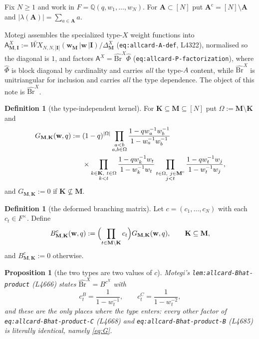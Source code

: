 \documentclass[11pt]{article}
\theoremstyle{plain}
\newtheorem{prop}[thm]{Proposition}
\theoremstyle{definition}
\newtheorem{defn}[thm]{Definition}
\theoremstyle{remark}
\newcommand{\bM}{\mathbf M}
\newcommand{\bK}{\mathbf K}
\newcommand{\bI}{\mathbf I}
\newcommand{\bA}{\mathbf A}
\newcommand{\bw}{\mathbf w}
\newcommand{\cm}{{\mathrm c}}
\newcommand{\Bh}{\widehat{\mathrm{Br}}}
\begin{document}
Fix $N\ge1$ and work in $F=\mathbb Q(q,w_1,\dots,w_N)$. For $\bA\subset[N]$ put
$\bA^\cm=[N]\setminus\bA$ and $|\lambda(\bA)|=\sum_{a\in\bA}a$.

Motegi assembles the specialized type-$X$ weight functions into
$\mathsf A^X_{\bM,\bI}:=\widetilde{WX}_{N,N,|\bI|}(\bw_\bM\,|\bw\,|\bI)/\Delta^X_\bM$
(\texttt{eq:allcard-A-def}, L4322), normalised so the diagonal is $1$, and factors
$\mathsf A^X=\Bh^X\widehat\Phi$ (\texttt{eq:allcard-P-factorization}), where
$\widehat\Phi$ is block diagonal by cardinality and carries \emph{all} the type-$A$
content, while $\Bh^X$ is unitriangular for inclusion and carries \emph{all} the
type dependence. The object of this note is $\Bh^X$.

\begin{defn}[the type-independent kernel]
\label{def:G}
For $\bK\subseteq\bM\subseteq[N]$ put $\Omega:=\bM\setminus\bK$ and
\begin{align}
G_{\bM,\bK}(\bw,q):={}&(1-q)^{|\Omega|}
\prod_{\substack{a<b\\ a,b\in\Omega}}
\frac{1-qw_a^{-1}w_b^{-1}}{1-w_a^{-1}w_b^{-1}}
\notag\\
&\times
\prod_{\substack{k\in\bK,\ t\in\Omega\\ k<t}}
\frac{1-qw_k^{-1}w_t}{1-w_k^{-1}w_t}
\prod_{\substack{t\in\Omega,\ j\in\bM^\cm\\ j<t}}
\frac{1-qw_t^{-1}w_j}{1-w_t^{-1}w_j},
\label{eq:G}
\end{align}
and $G_{\bM,\bK}:=0$ if $\bK\not\subseteq\bM$.
\end{defn}

\begin{defn}[the deformed branching matrix]
\label{def:Bc}
Let $c=(c_1,\dots,c_N)$ with each $c_t\in F^\times$. Define
\[
B^c_{\bM,\bK}(\bw,q):=\Bigl(\prod_{t\in\bM\setminus\bK}c_t\Bigr)G_{\bM,\bK}(\bw,q),
\qquad \bK\subseteq\bM,
\]
and $B^c_{\bM,\bK}:=0$ otherwise.
\end{defn}

\begin{prop}[the two types are two values of $c$]
\label{prop:types}
Motegi's \texttt{lem:allcard-Bhat-product} {\rm(L4666)} states
$\Bh^X=B^{c^X}$ with
\[
c^B_t=\frac1{1-w_t^{-1}},\qquad c^C_t=\frac1{1-w_t^{-2}},
\]
and these are the \emph{only} places where the type enters: every other factor of
\texttt{eq:allcard-Bhat-product-C} (L4668) and \texttt{eq:allcard-Bhat-product-B}
(L4685) is literally identical, namely \eqref{eq:G}.
\end{prop}
\end{document}
